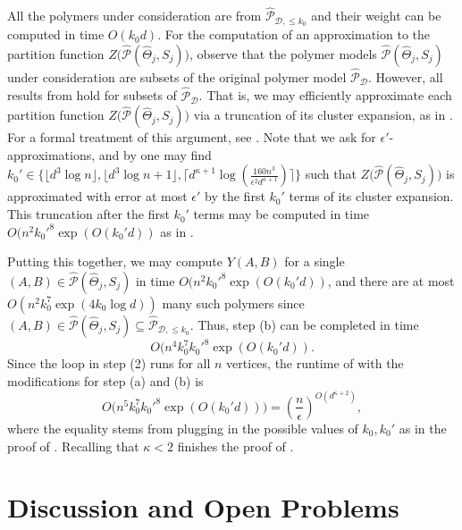 \documentclass[reqno,a4paper,11pt]{amsart}
\newcommand{\cD}{\mathcal{D}}
\newcommand{\cP}{\mathcal{P}}
\newcommand{\ex}{\kappa}
\begin{document}
All the polymers under consideration are from $\hat{\cP}_{\cD, \leq k_0}$ and their weight can be computed in time $O(k_0 d)$. For the computation of an approximation to the partition function $Z\bigl(\hat{\cP}(\hat{\Theta}_j, S_j)\bigr)$, observe that the polymer models $\hat{\cP}(\hat{\Theta}_j, S_j)$ under consideration are subsets of the original polymer model $\hat{\cP}_{\cD}$. However, all results from  hold for subsets of $\hat{\cP}_{\cD}$. That is, we may efficiently approximate each partition function $Z\bigl(\hat{\cP}(\hat{\Theta}_j, S_j)\bigr)$ via a truncation of its cluster expansion, as in . For a formal treatment of this argument, see \cite[Lemma 2.8]{HePeRe20}. Note that we ask for $\epsilon'$-approximations, and by  one may find $k_0' \in \{\lfloor d^3 \log n \rfloor, \lfloor d^3 \log n+1 \rfloor, \lceil d^{\ex +1} \log \left(\frac{160n^3}{\epsilon^2 d^{\ex+1}}\right) \rceil\}$ such that
$Z\bigl(\hat{\cP}(\hat{\Theta}_j, S_j)\bigr)$ is approximated with error at most $\epsilon'$ by the first $k_0'$ terms of its cluster expansion. This truncation after the first $k_0'$ terms may be computed in time $O(n^2 k_0'^8 \exp(O(k_0' d))$ as in .

Putting this together, we may compute $Y(A, B)$ for a single $(A, B) \in \hat{\cP}(\hat{\Theta}_j, S_j)$ in time $O(n^2 k_0'^8 \exp(O(k_0' d))$, and there are at most $O(n^2 k_0^7 \exp(4k_0 \log d))$ many such polymers since $(A, B) \in \hat{\cP}(\hat{\Theta}_j, S_j) \subseteq \hat{\cP}_{\cD, \leq k_0}$. Thus, step (b) can be completed in time
$$O(n^4 k_0^7 k_0'^8 \exp(O(k_0' d)).$$
Since the loop in step (2) runs for all $n$ vertices, the runtime of  with the modifications for step (a) and (b) is
\[
O\bigl(n^5 k_0^7 k_0'^8 \exp\left(O(k_0' d)\right)\bigr)= \left(\frac{n}{\epsilon} \right)^{O(d^{\ex+2})},
\]
where the equality stems from plugging in the possible values of $k_0, k_0'$ as in the proof of .
Recalling that $\ex<2$ finishes the proof of .

\section{Discussion and Open Problems} \label{sec:discussion}
\end{document}
